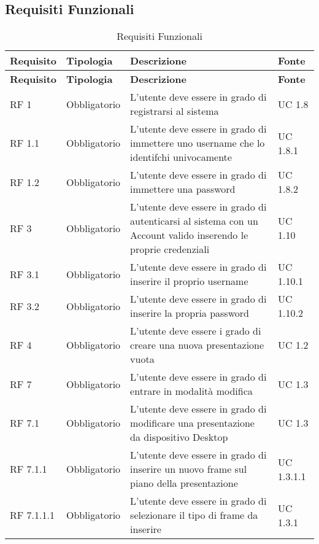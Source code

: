\subsection{Requisiti Funzionali}{
	\renewcommand*{\arraystretch}{1.4}
	\begin{longtable} [c]{| p{2.5cm} | p{2.5cm} | p{6cm} |p{2.5cm}|}
		\caption{Requisiti Funzionali \label{tab:reqFunzionali}}\\
	 \hline
	 \textbf{Requisito} & \textbf{Tipologia} & \textbf{Descrizione} & \textbf{Fonte} \\
	 \hline
	 \endfirsthead
	 \hline
	 \textbf{Requisito} & \textbf{Tipologia} & \textbf{Descrizione} & \textbf{Fonte} \\
	 \hline
			\endhead
	 \hline
	 \endfoot
	 \hline
	 \endlastfoot
		RF 1 & Obbligatorio & L'utente deve essere in grado di registrarsi al sistema & UC 1.8\\
		\hline
		RF 1.1 & Obbligatorio & L'utente deve essere in grado di immettere uno username che lo identifchi univocamente & UC 1.8.1\\
		\hline
		RF 1.2 & Obbligatorio & L'utente deve essere in grado di immettere una password & UC 1.8.2\\
		\hline
		RF 3 & Obbligatorio & L'utente deve essere in grado di autenticarsi al sistema con un Account\ped{g} valido inserendo le proprie credenziali & UC 1.10\\
		\hline
		RF 3.1 & Obbligatorio & L'utente deve essere in grado di inserire il proprio username & UC 1.10.1\\		
		\hline
		RF 3.2 & Obbligatorio & L'utente deve essere in grado di inserire la propria password & UC 1.10.2\\
		\hline
		RF 4 & Obbligatorio & L’utente deve essere i grado di creare una nuova presentazione vuota & UC 1.2\\
		\hline	
		RF 7 & Obbligatorio & L'utente deve essere in grado di entrare in modalità modifica & UC 1.3\\
		\hline
		RF 7.1 & Obbligatorio & L'utente deve essere in grado di modificare una presentazione da dispositivo Desktop\ped{g} & UC 1.3\\						
		\hline
		RF 7.1.1 & Obbligatorio & L'utente deve essere in grado di inserire un nuovo frame\ped{g} sul piano della presentazione\ped{g} & UC 1.3.1.1\\
		\hline
		RF 7.1.1.1 & Obbligatorio & L'utente deve essere in grado di selezionare il tipo di frame\ped{g} da inserire & UC 1.3.1\\

\end{longtable}}

